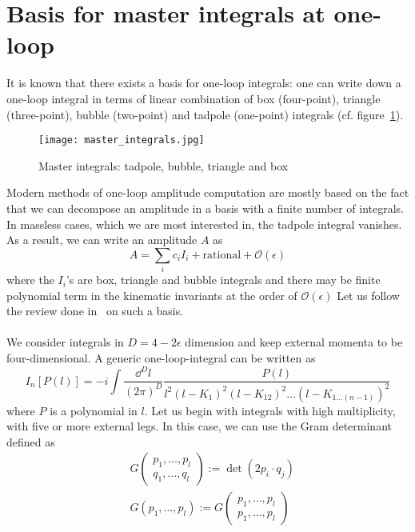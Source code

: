 \section{Basis for master integrals at one-loop} 
It is known that there exists a basis for one-loop integrals: one can write down a one-loop integral in terms of linear combination of box (four-point), triangle (three-point), bubble (two-point) and tadpole (one-point) integrals (cf. figure~\ref{fig-mi}).
\begin{figure}[h]
  \centering
  \texttt{[image: master\_integrals.jpg]}
  \caption{Master integrals: tadpole, bubble, triangle and box}
  \label{fig-mi}
\end{figure}
Modern methods of one-loop amplitude computation are mostly based on the fact that we can decompose an amplitude in a basis with a finite number of integrals.
In massless cases, which we are most interested in, the tadpole integral vanishes. 
As a result, we can write an amplitude $A$ as
\begin{equation}\label{master_equation}
A = \sum_i c_i I_i + \mathrm{rational} + \mathcal{O}(\epsilon)
\end{equation}
where the $I_i$'s are box, triangle and bubble integrals and there may be finite polynomial term in the kinematic invariants at the order of $\mathcal{O}(\epsilon)$
Let us follow the review done in~\cite{Gluza:2010ws} on such a basis.
\\\\
We consider integrals in $D= 4-2\epsilon$ dimension and keep external momenta to be four-dimensional.
A generic one-loop-integral can be written as
\begin{equation}\label{generic_loop_int}
I_n[P(l)] = 
-i\int\frac{\dd^D l}{(2\pi)^D}\frac{P(l)}{l^2(l-K_1)^2(l-K_{12})^2\ldots(l-K_{1\ldots (n-1)})^2}
\end{equation}
where $P$ is a polynomial in $l$.
Let us begin with integrals with high multiplicity, with five or more external legs.
In this case, we can use the Gram determinant defined as
\begin{equation*}
\begin{split}
& G\begin{pmatrix}
p_1,\ldots, p_l \\
q_1,\ldots, q_l 
\end{pmatrix}
:= \det(2p_i\cdot q_j)
\\
& G(p_1, \ldots , p_l) := G\begin{pmatrix}
p_1,\ldots, p_l \\
p_1,\ldots, p_l 
\end{pmatrix}
\end{split}
\end{equation*} 
